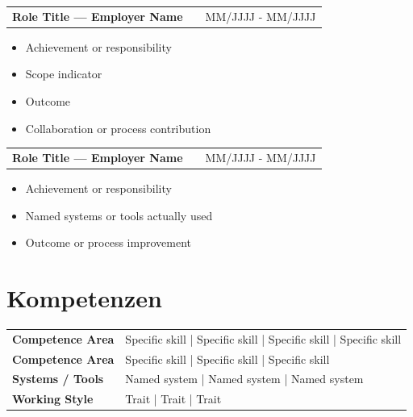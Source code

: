 \documentclass[a4paper,10pt]{article}
\makeatletter
\newcommand{\headingskills}{Kompetenzen}
\newenvironment{jobshort}[2]
    {
    \begin{tabularx}{\linewidth}{@{}l X r@{}}
    \textbf{#1} & \hfill &  #2 \\[2pt]
    \end{tabularx}
    }
    {
    }
\newenvironment{joblong}[2]
    {
    \begin{tabularx}{\linewidth}{@{}l X r@{}}
    \textbf{#1} & \hfill &  #2 \\[2pt]
    \end{tabularx}
    \begin{minipage}[t]{\linewidth}
    \begin{itemize}[nosep,after=\strut, leftmargin=1em, itemsep=0.5pt,label=--]
    }
    {
    \end{itemize}
    \end{minipage}
    }
\makeatother
\begin{document}
\begin{joblong}{Role Title — Employer Name}{MM/JJJJ - MM/JJJJ}
\item Achievement or responsibility
\item Scope indicator
\item Outcome
\item Collaboration or process contribution
\end{joblong}

\begin{joblong}{Role Title — Employer Name}{MM/JJJJ - MM/JJJJ}
\item Achievement or responsibility
\item Named systems or tools actually used
\item Outcome or process improvement
\end{joblong}



\section{\headingskills}

\begin{tabularx}{\linewidth}{@{}l X@{}}
\textbf{Competence Area} & Specific skill | Specific skill | Specific skill | Specific skill \\

\textbf{Competence Area} & Specific skill | Specific skill | Specific skill \\

\textbf{Systems / Tools} & Named system | Named system | Named system \\

\textbf{Working Style} & Trait | Trait | Trait \\
\end{tabularx}

\end{document}
